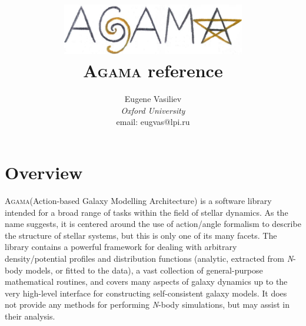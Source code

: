 \documentclass[12pt]{article}
\newcommand{\Agama}{\textsc{Agama}\xspace}
\newcommand{\Nbody}{\textsl{N}-body\xspace}
\begin{document}
\title{\includegraphics[width=8cm]{agama.jpg}\protect\\[0.5cm]\Agama reference}
\author{Eugene Vasiliev\\
\normalsize\textit{Oxford University}\\
\normalsize\textrm{email: eugvas@lpi.ru} }


\maketitle
\tableofcontents
\newpage

\section{Overview}

\Agama (Action-based Galaxy Modelling Architecture) is a software library intended for a broad range of tasks within the field of stellar dynamics. As the name suggests, it is centered around the use of action/angle formalism to describe the structure of stellar systems, but this is only one of its many facets. The library contains a powerful framework for dealing with arbitrary density/potential profiles and distribution functions (analytic, extracted from \Nbody models, or fitted to the data), a vast collection of general-purpose mathematical routines, and covers many aspects of galaxy dynamics up to the very high-level interface for constructing self-consistent galaxy models. It does not provide any methods for performing \Nbody simulations, but may assist in their analysis.
\end{document}
